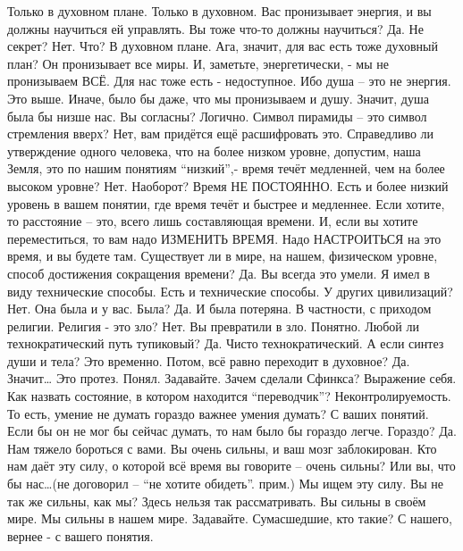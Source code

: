 \documentclass{extbook}
\newcommand{\soul}[1]{{#1}}
\newcommand{\people}[1]{{#1}}
\begin{document}
\soul{Только в духовном плане.}
\people{Только в духовном.}
\soul{Вас пронизывает энергия, и вы должны  научиться ей  управлять.}
\people{Вы тоже что-то должны научиться?}
\soul{Да.}
\people{Не секрет?}
\soul{Нет.}
\people{Что?}
\soul{В духовном плане.}
\people{Ага, значит, для вас есть тоже духовный план?}
\soul{Он пронизывает все миры. И, заметьте, энергетически, - мы не пронизываем ВСЁ. Для нас тоже есть - недоступное. Ибо душа – это не энергия. Это выше. Иначе, было бы даже, что мы пронизываем и душу. Значит, душа была бы низше нас. Вы согласны? }
\people{Логично. Символ пирамиды – это символ стремления вверх?}
\soul{Нет, вам придётся ещё расшифровать это.}
\people{Справедливо ли утверждение одного человека, что на более низком уровне, допустим, наша Земля, это по нашим понятиям  ``низкий'',-  время течёт медленней, чем на более высоком уровне?}
\soul{Нет. }
\people{Наоборот?}
\soul{Время НЕ ПОСТОЯННО. Есть и более низкий уровень в вашем понятии, где время  течёт и быстрее и медленнее. Если хотите, то расстояние – это,  всего  лишь  составляющая времени. И, если вы хотите переместиться, то вам надо ИЗМЕНИТЬ ВРЕМЯ. Надо НАСТРОИТЬСЯ на это время, и вы будете там.}
\people{Существует ли в мире, на нашем, физическом уровне, способ достижения сокращения времени?}
\soul{Да. Вы всегда это умели.}
\people{Я имел в виду технические способы.}
\soul{Есть и технические способы.}
\people{У других цивилизаций?}
\soul{Нет. Она была и у вас.}
\people{Была?}
\soul{Да. И была потеряна. В частности, с приходом религии.}
\people{Религия - это зло?}
\soul{Нет. Вы превратили в зло.}
\people{Понятно.  Любой ли технократический путь  тупиковый?}
\soul{Да.}
\people{Чисто технократический. А если синтез души и тела?}
\soul{Это временно.}
\people{Потом, всё равно переходит в духовное?}
\soul{Да.}
\people{Значит…}
\soul{Это протез.}
\people{Понял.}
\soul{Задавайте.}
\people{Зачем сделали Сфинкса?}
\soul{Выражение себя.}
\people{Как назвать состояние, в котором находится  ``переводчик''?}
\soul{Неконтролируемость.}
\people{То есть, умение не думать  гораздо важнее умения думать? С ваших понятий.}
\soul{Если бы он не мог бы сейчас думать, то нам было бы гораздо легче.}
\people{Гораздо?}
\soul{Да. Нам тяжело бороться с вами. Вы очень сильны, и ваш мозг заблокирован.}
\people{Кто нам даёт эту силу, о которой всё время вы говорите – очень сильны? Или вы, что бы  нас…(не договорил – ``не хотите обидеть''.  прим.)}
\soul{Мы ищем эту силу.}
\people{Вы не так же сильны, как мы?}
\soul{Здесь нельзя так рассматривать. Вы сильны в своём мире. Мы  сильны в нашем мире. Задавайте.}
\people{Сумасшедшие,  кто такие? С нашего, вернее - с вашего понятия.}
\end{document}
